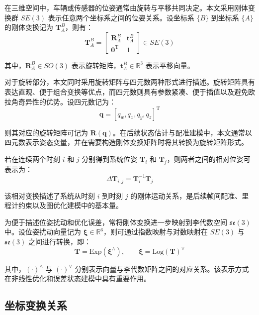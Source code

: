 在三维空间中，车辆或传感器的位姿通常由旋转与平移共同决定。本文采用刚体变换群 $SE(3)$ 表示任意两个坐标系之间的位姿关系。设坐标系 $\{B\}$ 到坐标系 $\{A\}$ 的刚体变换记为 $\mathbf{T}_{A}^{B}$，则有：
\begin{equation}
\mathbf{T}_{A}^{B}
=
\begin{bmatrix}
\mathbf{R}_{A}^{B} & \mathbf{t}_{A}^{B}\\
\mathbf{0}^{\mathrm T} & 1
\end{bmatrix}
\in SE(3)
\end{equation}

其中，$\mathbf{R}_{A}^{B}\in SO(3)$ 表示旋转矩阵，$\mathbf{t}_{A}^{B}\in \mathbb{R}^{3}$ 表示平移向量。

对于旋转部分，本文同时采用旋转矩阵与四元数两种形式进行描述。旋转矩阵具有表达直观、便于组合变换等优点，而四元数则具有参数紧凑、便于插值以及避免欧拉角奇异性的优势。设四元数记为：
\begin{equation}
\mathbf{q}
=
\left[
q_w,q_x,q_y,q_z
\right]^{\mathrm T}
\end{equation}

则其对应的旋转矩阵可记为 $\mathbf{R}(\mathbf{q})$。在后续状态估计与配准建模中，本文通常以四元数表示姿态变量，并在需要构造刚体变换矩阵时将其转换为旋转矩阵形式。

若在连续两个时刻 $i$ 和 $j$ 分别得到系统位姿 $\mathbf{T}_i$ 和 $\mathbf{T}_j$，则两者之间的相对位姿可表示为：
\begin{equation}
\Delta \mathbf{T}_{i,j}
=
\mathbf{T}_{i}^{-1}\mathbf{T}_{j}
\end{equation}

该相对变换描述了系统从时刻 $i$ 到时刻 $j$ 的刚体运动关系，是后续帧间配准、里程计约束以及图优化建模中的基本量。

为便于描述位姿扰动和优化误差，常将刚体变换进一步映射到李代数空间 $\mathfrak{se}(3)$ 中。设位姿扰动向量记为 $\boldsymbol{\xi}\in \mathbb{R}^{6}$，则可通过指数映射与对数映射在 $SE(3)$ 与 $\mathfrak{se}(3)$ 之间进行转换，即：
\begin{equation}
\mathbf{T}
=
\mathrm{Exp}\left(\boldsymbol{\xi}^{\wedge}\right),
\qquad
\boldsymbol{\xi}
=
\mathrm{Log}\left(\mathbf{T}\right)^{\vee}
\end{equation}

其中，$(\cdot)^{\wedge}$ 与 $(\cdot)^{\vee}$ 分别表示向量与李代数矩阵之间的对应关系。该表示方式在非线性优化和误差状态建模中具有重要作用。

\subsection{坐标变换关系}

